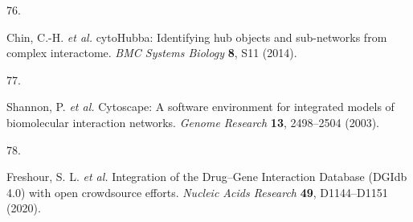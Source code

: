 \documentclass[
  11,
  a4paper,
]{article}
\newlength{\cslhangindent}
\newlength{\csllabelwidth}
\newlength{\cslentryspacingunit} %
\newenvironment{CSLReferences}[2] %
 {%
  \setlength{\parindent}{0pt}
  \ifodd #1
  \let\oldpar\par
  \def\par{\hangindent=\cslhangindent\oldpar}
  \fi
  \setlength{\parskip}{#2\cslentryspacingunit}
 }%
 {}
\newcommand{\CSLLeftMargin}[1]{\parbox[t]{\csllabelwidth}{#1}}
\newcommand{\CSLRightInline}[1]{\parbox[t]{\linewidth - \csllabelwidth}{#1}\break}
\begin{document}
\begin{CSLReferences}{0}{0}
\leavevmode{}%
\CSLLeftMargin{76. }%
\CSLRightInline{Chin, C.-H. \emph{et al.} {cytoHubba}: Identifying hub
objects and sub-networks from complex interactome. \emph{BMC Systems
Biology} \textbf{8}, S11 (2014).}

\leavevmode{}%
\CSLLeftMargin{77. }%
\CSLRightInline{Shannon, P. \emph{et al.} Cytoscape: A software
environment for integrated models of biomolecular interaction networks.
\emph{Genome Research} \textbf{13}, 2498--2504 (2003).}

\leavevmode{}%
\CSLLeftMargin{78. }%
\CSLRightInline{Freshour, S. L. \emph{et al.} {Integration of the
Drug--Gene Interaction Database (DGIdb 4.0) with open crowdsource
efforts}. \emph{Nucleic Acids Research} \textbf{49}, D1144--D1151
(2020).}

\end{CSLReferences}
\end{document}
